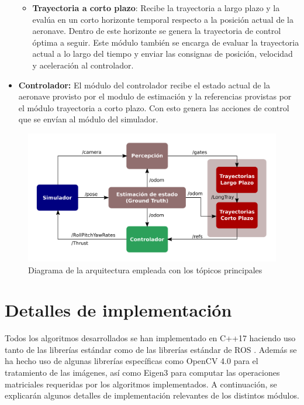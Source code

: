\begin{itemize}
\begin{itemize}
		\item \textbf{Trayectoria a corto plazo}: Recibe la trayectoria a largo plazo y la evalúa en un corto horizonte temporal respecto a la posición actual de la aeronave. Dentro de este horizonte se genera la trayectoria de control óptima a seguir. Este módulo también se encarga de evaluar la trayectoria actual a lo largo del tiempo y enviar las consignas de posición, velocidad y aceleración al controlador.
	\end{itemize}
	
	\item \textbf{Controlador:} El módulo del controlador recibe el estado actual de la aeronave provisto por el modulo de estimación y la referencias provistas por el módulo trayectoria a corto plazo. Con esto genera las acciones de control que se envían al módulo del simulador.
	
\end{itemize}

\begin{figure}[htb!]
	\centering
	\includegraphics[width=\textwidth]{imagenes/Arquitectura}
	\caption{Diagrama de la arquitectura empleada con los tópicos principales}
	\label{Arquitectura}
\end{figure}


\section{Detalles de implementación}

Todos los algoritmos desarrollados se han implementado en C++17 haciendo uso tanto de las librerías estándar como de las librerías estándar de ROS . Además se ha hecho uso de algunas librerías específicas como OpenCV 4.0 para el tratamiento de las imágenes, así como Eigen3 para computar las operaciones matriciales requeridas por los algoritmos implementados. A continuación, se explicarán algunos detalles de implementación relevantes de los distintos módulos.

